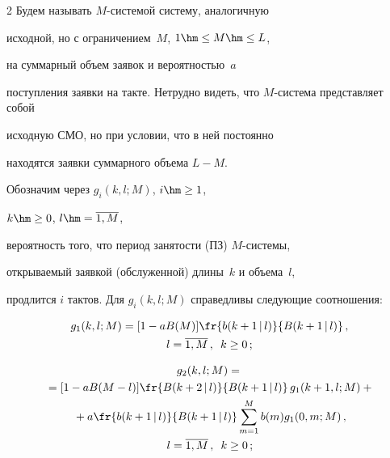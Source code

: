 \begin{multicols}{2}
Будем называть $M$-системой систему, аналогичную


исходной, но с ограничением~$M$, ${1\hm\le M\hm\le L}$,


на суммарный объем заявок и вероятностью~$a$


поступления заявки на такте. Нетрудно видеть, что $M$-сис\-те\-ма представляет собой


исходную СМО, но при условии, что в ней постоянно


находятся заявки суммарного объема $L-M$.








Обозначим через $g_i(k,l;M)$, $i\hm\ge 1$,


$k\hm\ge 0$, $l\hm=\overline{1,M}$,


вероятность того, что период занятости (ПЗ) $M$-сис\-те\-мы,


открываемый заявкой (обслуженной) длины~$k$ и объема~$l$,


продлится $i$ тактов. Для $g_i(k,l;M)$ справедливы следующие соотношения:


\begin{multline}


\label{4.1}


g_1(k,l;M) = [1 - a B(M)]\fr{b(k+1\,|\,l)}{B(k+1\,|\,l)}\,,\\


l= \overline{1,M}\,,\enskip  k\ge 0\,;


\end{multline}





\vspace*{-9pt}





\noindent


\begin{multline}


\label{4.2}


g_2(k,l;M)={}\\


{}= [1 - a B(M-l)]\fr{B(k+2\,|\,l) }{B(k+1\,|\,l)}


\, g_{1}(k+1,l;M)+{}\\


{}+


a \fr{b(k+1\,|\,l) }{ B(k+1\,|\,l)} \sum\limits_{m=1}^{M}


b(m) g_{1}(0,m;M)\,,\\  l= \overline{1,M}\,,\enskip  k\ge 0\,;



\end{multline}
\end{multicols}
